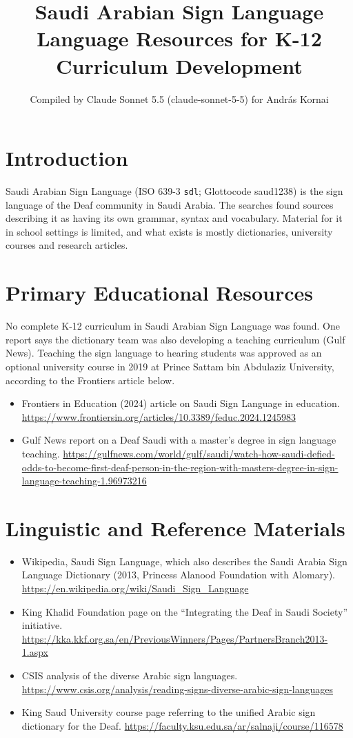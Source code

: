 \documentclass[12pt]{article}
\title{Saudi Arabian Sign Language Language Resources for K-12 Curriculum Development}
\author{Compiled by Claude Sonnet 5.5 (claude-sonnet-5-5) for Andr\'as Kornai}
\date{}
\begin{document}
\maketitle

\section{Introduction}
Saudi Arabian Sign Language (ISO 639-3 \texttt{sdl}; Glottocode saud1238) is the sign language of the Deaf community in Saudi Arabia. The searches found sources describing it as having its own grammar, syntax and vocabulary. Material for it in school settings is limited, and what exists is mostly dictionaries, university courses and research articles.

\section{Primary Educational Resources}
No complete K-12 curriculum in Saudi Arabian Sign Language was found. One report says the dictionary team was also developing a teaching curriculum (Gulf News). Teaching the sign language to hearing students was approved as an optional university course in 2019 at Prince Sattam bin Abdulaziz University, according to the Frontiers article below.
\begin{itemize}
\item Frontiers in Education (2024) article on Saudi Sign Language in education. \url{https://www.frontiersin.org/articles/10.3389/feduc.2024.1245983}
\item Gulf News report on a Deaf Saudi with a master's degree in sign language teaching. \url{https://gulfnews.com/world/gulf/saudi/watch-how-saudi-defied-odds-to-become-first-deaf-person-in-the-region-with-masters-degree-in-sign-language-teaching-1.96973216}
\end{itemize}

\section{Linguistic and Reference Materials}
\begin{itemize}
\item Wikipedia, Saudi Sign Language, which also describes the Saudi Arabia Sign Language Dictionary (2013, Princess Alanood Foundation with Alomary). \url{https://en.wikipedia.org/wiki/Saudi_Sign_Language}
\item King Khalid Foundation page on the ``Integrating the Deaf in Saudi Society'' initiative. \url{https://kka.kkf.org.sa/en/PreviousWinners/Pages/PartnersBranch2013-1.aspx}
\item CSIS analysis of the diverse Arabic sign languages. \url{https://www.csis.org/analysis/reading-signs-diverse-arabic-sign-languages}
\item King Saud University course page referring to the unified Arabic sign dictionary for the Deaf. \url{https://faculty.ksu.edu.sa/ar/salnaji/course/116578}
\end{itemize}
\end{document}
